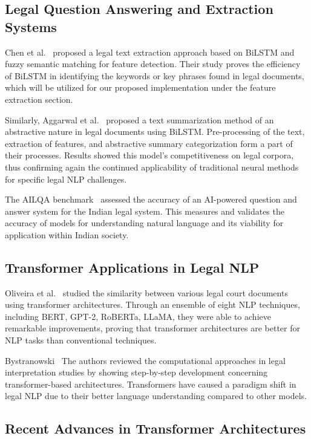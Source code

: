 \documentclass[preprint,12pt]{elsarticle}
\begin{document}
\subsection{Legal Question Answering and Extraction Systems}

Chen et al.~\cite{chen2025bilstm} proposed a legal text extraction approach based on BiLSTM and fuzzy semantic matching for feature detection. Their study proves the efficiency of BiLSTM in identifying the keywords or key phrases found in legal documents, which will be utilized for our proposed implementation under the feature extraction section.

Similarly, Aggarwal et al.~\cite{aggarwal2025abstractive} proposed a text summarization method of an abstractive nature in legal documents using BiLSTM. Pre-processing of the text, extraction of features, and abstractive summary categorization form a part of their processes. Results showed this model's competitiveness on legal corpora, thus confirming again the continued applicability of traditional neural methods for specific legal NLP challenges.

The AILQA benchmark~\cite{ailqa2024} assessed the accuracy of an AI-powered question and answer system for the Indian legal system. This measures and validates the accuracy of models for understanding natural language and its viability for application within Indian society.

\subsection{Transformer Applications in Legal NLP}

Oliveira et al.~\cite{oliveira2025similarity} studied the similarity between various legal court documents using transformer architectures. Through an ensemble of eight NLP techniques, including BERT, GPT-2, RoBERTa, LLaMA, they were able to achieve remarkable improvements, proving that transformer architectures are better for NLP tasks than conventional techniques.

Bystranowski~\cite{bystranowski2025computational} The authors reviewed the computational approaches in legal interpretation studies by showing step-by-step development concerning transformer-based architectures. Transformers have caused a paradigm shift in legal NLP due to their better language understanding compared to other models.

\subsection{Recent Advances in Transformer Architectures}
\end{document}
